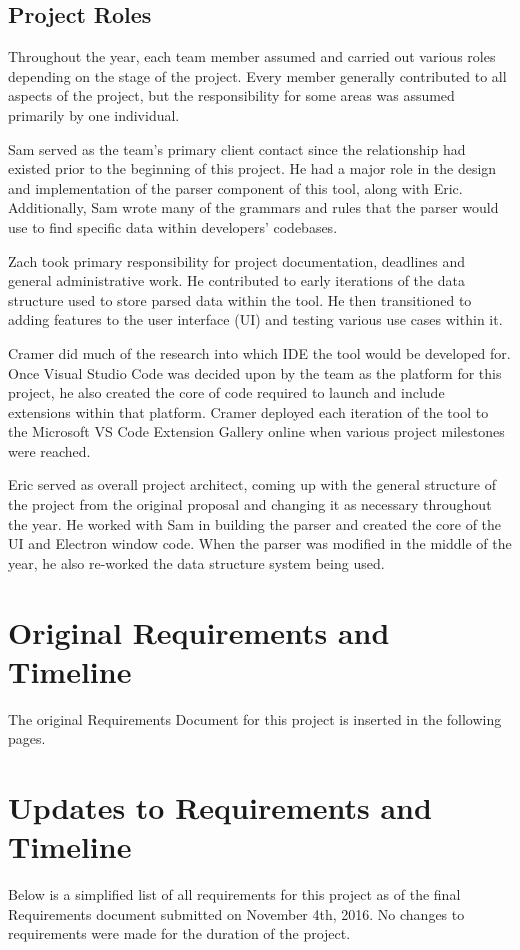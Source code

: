 \documentclass[letterpaper,10pt,titlepage,draftclsnofoot,onecolumn,onesided] {IEEEtran}
\begin{document}
\subsection{Project Roles}
Throughout the year, each team member assumed and carried out various roles depending on the stage of the project. 
Every member generally contributed to all aspects of the project, but the responsibility for some areas was assumed primarily by one individual.

Sam served as the team's primary client contact since the relationship had existed prior to the beginning of this project. 
He had a major role in the design and implementation of the parser component of this tool, along with Eric. 
Additionally, Sam wrote many of the grammars and rules that the parser would use to find specific data within developers' codebases. 

Zach took primary responsibility for project documentation, deadlines and general administrative work. He contributed to early iterations of the data structure used to store parsed data within the tool. 
He then transitioned to adding features to the user interface (UI) and testing various use cases within it.

Cramer did much of the research into which IDE the tool would be developed for. 
Once Visual Studio Code was decided upon by the team as the platform for this project, he also created the core of code required to launch and include extensions within that platform. 
Cramer deployed each iteration of the tool to the Microsoft VS Code Extension Gallery online when various project milestones were reached.

Eric served as overall project architect, coming up with the general structure of the project from the original proposal and changing it as necessary throughout the year. 
He worked with Sam in building the parser and created the core of the UI and Electron window code. 
When the parser was modified in the middle of the year, he also re-worked the data structure system being used. \\


\section{Original Requirements and Timeline}
The original Requirements Document for this project is inserted in the following pages.

\pagebreak
\section{Updates to Requirements and Timeline}
Below is a simplified list of all requirements for this project as of the final Requirements document submitted on November 4th, 2016. 
No changes to requirements were made for the duration of the project.
\end{document}
